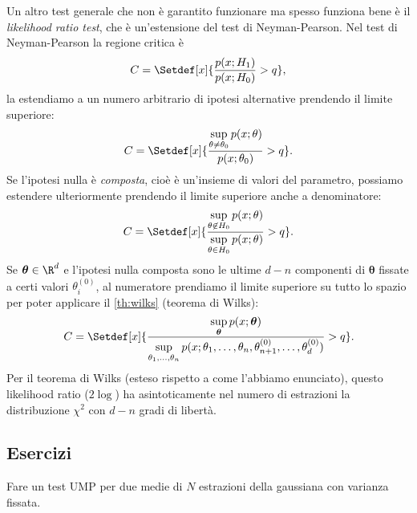 Un altro test generale che non è garantito funzionare ma spesso funziona bene
è il \emph{likelihood ratio test}, che è un'estensione del test di Neyman-Pearson.
Nel test di Neyman-Pearson la regione critica è
\begin{equation*}
	C = \Setdef[x]{\frac{p(x;H_1)}{p(x;H_0)} > q},
\end{equation*}
la estendiamo a un numero arbitrario di ipotesi alternative prendendo il limite superiore:
\begin{equation*}
	C = \Setdef[x]{\frac {\sup\limits_{\theta\neq\theta_0} p(x;\theta)} {p(x;\theta_0)} > q}.
\end{equation*}
Se l'ipotesi nulla è \emph{composta},
cioè è un'insieme di valori del parametro,
possiamo estendere ulteriormente prendendo il limite superiore anche a denominatore:
\begin{equation*}
	C = \Setdef[x]{\frac {\sup\limits_{\theta\not\in H_0} p(x;\theta)} {\sup\limits_{\theta\in H_0} p(x;\theta)} > q}.
\end{equation*}
Se $\boldsymbol\theta\in\R^d$
e l'ipotesi nulla composta sono le ultime $d-n$ componenti di $\boldsymbol\theta$
fissate a certi valori $\theta_i^{(0)}$,
al numeratore prendiamo il limite superiore su tutto lo spazio
per poter applicare il \autoref{th:wilks} (teorema di Wilks):
\begin{equation*}
	C = \Setdef[x]{\frac
	{\sup\limits_{\boldsymbol\theta} p(x;\boldsymbol\theta)}
	{\sup\limits_{\theta_1,\dotsc,\theta_n} p(x;\theta_1,\dotsc,\theta_n,\theta_{n+1}^{(0)},\dotsc,\theta_d^{(0)})} > q}.
\end{equation*}
Per il teorema di Wilks (esteso rispetto a come l'abbiamo enunciato),
questo likelihood ratio ($2\log$) ha asintoticamente nel numero di estrazioni
la distribuzione $\chi^2$ con $d-n$ gradi di libertà.


\subsection{Esercizi}

\begin{exercise}
	Fare un test UMP per due medie di $N$ estrazioni della gaussiana con varianza fissata.
\end{exercise}

